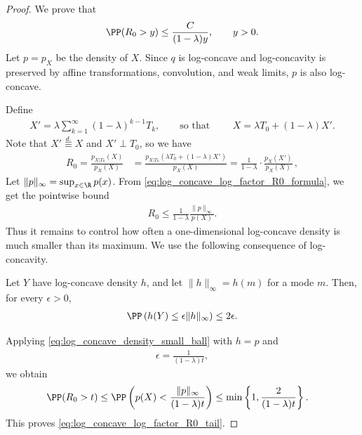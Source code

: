 \begin{proof}
    We prove that
    \begin{align}
        \PP(R_0>y)
        \le
        \frac{C}{(1-\lambda)y},
        \qquad y>0.
        \label{eq:log_concave_log_factor_R0_tail}
    \end{align}
    Let $p=p_X$ be the density of $X$.
    Since $q$ is log-concave and log-concavity is preserved by affine transformations,
    convolution, and weak limits, $p$ is also log-concave.

    Define
    \begin{align}
        X'=\lambda\sum_{k=1}^\infty (1-\lambda)^{k-1} T_k,
        \qquad
        \text{so that }\qquad
        X=\lambda T_0+(1-\lambda) X'.
    \end{align}
    Note that $X' \stackrel{d.}{\equiv} X$ and $X' \perp T_0$,
    so we have
    \begin{align}
        R_0
        =
        \frac{p_{X|T_0}(X)}{p_X(X)}
         & =
        \frac{p_{X|T_0}(\lambda T_0 + (1-\lambda) X')}{p_{X}(X)}
        =
        \frac{1}{1-\lambda}\cdot \frac{p_X(X')}{p_X(X)}\,,\label{eq:log_concave_log_factor_R0_formula}
    \end{align}
    Let $\|p\|_\infty = \sup_{x\in\R} p(x)$.
    From \eqref{eq:log_concave_log_factor_R0_formula}, we get the pointwise bound
    \begin{align}
        R_0
        \le
        \frac{1}{1-\lambda}\frac{\|p\|_\infty}{p(X)}.
        \label{eq:log_concave_log_factor_R0_density_upper}
    \end{align}
    Thus it remains to control how often a one-dimensional log-concave density is much smaller than its maximum.
    We use the following consequence of log-concavity.
    \begin{lemma}
        Let $Y$ have log-concave density $h$, and let $\|h\|_\infty=h(m)$ for a mode $m$.
        Then, for every $\epsilon > 0$,
        \begin{align}
            \PP\left(h(Y)\le \epsilon \|h\|_\infty\right)
            \le
            2\epsilon.
            \label{eq:log_concave_density_small_ball}
        \end{align}
    \end{lemma}
    Applying \eqref{eq:log_concave_density_small_ball} with $h=p$ and
    \begin{align}
        \epsilon=\frac{1}{(1-\lambda)t},
    \end{align}
    we obtain
    \begin{align}
        \PP(R_0>t)
         & \le
        \PP\left(
        p(X)<\frac{\|p\|_\infty}{(1-\lambda)t}
        \right) \le
        \min\left\{
        1,
        \frac{2}{(1-\lambda)t}
        \right\}.
    \end{align}
    This proves \eqref{eq:log_concave_log_factor_R0_tail}.
\end{proof}

